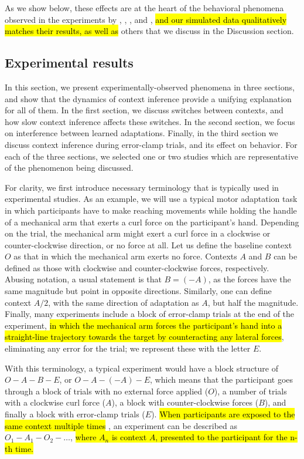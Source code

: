 \documentclass[a4paper,doc,floatsintext,natbib]{apa6}
\DeclareRobustCommand{\newcontent}[1]{\hl{#1}}
\begin{document}
As we show below, these effects are at the heart of the behavioral phenomena observed in the experiments by \cite{Kim_Neural_2015}, \cite{Oh_Minimizing_2019}, \cite{Davidson_Scaling_2004}, and \cite{Vaswani_Decay_2013}, \newcontent{and our simulated data qualitatively matches their results, as well as} others that we discuss in the Discussion section.



\subsection{Experimental results}
In this section, we present experimentally-observed phenomena in three sections, and show that the dynamics of context inference provide a unifying explanation for all of them. In the first section, we discuss switches between contexts, and how slow context inference affects these switches. In the second section, we focus on interference between learned adaptations. Finally, in the third section we discuss context inference during error-clamp trials, and its effect on behavior. For each of the three sections, we selected one or two studies which are representative of the phenomenon being discussed.

For clarity, we first introduce necessary terminology that is typically used in experimental studies. As an example, we will use a typical motor adaptation task in which participants have to make reaching movements while holding the handle of a mechanical arm that exerts a curl force on the participant's hand. Depending on the trial, the mechanical arm might exert a curl force in a clockwise or counter-clockwise direction, or no force at all. Let us define the baseline context $O$ as that in which the mechanical arm exerts no force. Contexts $A$ and $B$ can be defined as those with clockwise and counter-clockwise forces, respectively. Abusing notation, a usual statement is that $B = (-A)$, as the forces have the same magnitude but point in opposite directions. Similarly, one can define context $A/2$, with the same direction of adaptation as $A$, but half the magnitude. Finally, many experiments include a block of error-clamp trials at the end of the experiment, \newcontent{in which the mechanical arm forces the participant's hand into a straight-line trajectory towards the target by counteracting any lateral forces}, eliminating any error for the trial; we represent these with the letter $E$.

With this terminology, a typical experiment \cite[e.g.][]{Ethier_Spontaneous_2008} would have a block structure of $O-A-B-E$, or $O-A-(-A)-E$, which means that the participant goes through a block of trials with no external force applied ($O$), a number of trials with a clockwise curl force ($A$), a block with counter-clockwise forces ($B$), and finally a block with error-clamp trials ($E$). \newcontent{When participants are exposed to the same context multiple times }\citep[e.g.][]{Oh_Minimizing_2019}, an experiment can be described as $O_1-A_1-O_2-\ldots$, \newcontent{where $A_n$ is context $A$, presented to the participant for the n-th time.}
\end{document}
